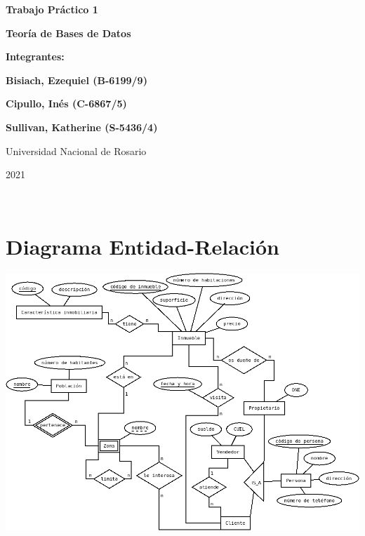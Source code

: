 \documentclass[11pt]{article}
\begin{document}
\begin{titlepage}
    \begin{center}
        \vfill
        \vfill
            \vspace{0.7cm}
            \noindent\textbf{\Huge Trabajo Práctico 1}\par
            \noindent\textbf{\Huge Teoría de Bases de Datos}\par
            \vspace{.5cm}
        \vfill
        \noindent \textbf{\huge Integrantes:}\par
        \vspace{.5cm}

        \noindent \textbf{\Large Bisiach, Ezequiel (B-6199/9)}\par
        \noindent \textbf{\Large Cipullo, Inés (C-6867/5)}\par
        \noindent \textbf{\Large Sullivan, Katherine (S-5436/4)}\par
 
        \vfill
        \large Universidad Nacional de Rosario \par
        \noindent\large 2021
    \end{center}
\end{titlepage}
\ \par


\section*{Diagrama Entidad-Relación}

\hspace{-1.5cm}\includegraphics[scale=.55]{../Diagrama1.png}
\end{document}
